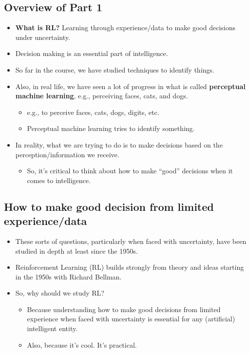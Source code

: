 \subsection{Overview of Part 1}
\begin{summary}
    \begin{itemize}
        \item \textbf{What is RL?} Learning through experience/data to make good decisions under uncertainty.
        \item Decision making is an essential part of intelligence.
        \item So far in the course, we have studied techniques to identify things.
        \item Also, in real life, we have seen a lot of progress in what is called \textbf{perceptual machine learning}, e.g., perceiving faces, cats, and dogs.
        \begin{itemize}
            \item e.g., to perceive faces, cats, dogs, digits, etc.
            \item Perceptual machine learning tries to identify something.
        \end{itemize}
        
        \item In reality, what we are trying to do is to make decisions based on the perception/information we receive.
        \begin{itemize}
            \item So, it's critical to think about how to make ``good'' decisions when it comes to intelligence.
        \end{itemize}
    \end{itemize}
\end{summary}

\subsection{How to make good decision from limited experience/data}
\begin{summary}
    \begin{itemize}
        \item These sorts of questions, particularly when faced with uncertainty, have been studied in depth at least since the 1950s.
        
        \item Reinforcement Learning (RL) builds strongly from theory and ideas starting in the 1950s with Richard Bellman.
        
        \item So, why should we study RL?
        \begin{itemize}
            \item Because understanding how to make good decisions from limited experience when faced with uncertainty is essential for any (artificial) intelligent entity.
            \item Also, because it's cool. It's practical.
        \end{itemize}
    \end{itemize}
\end{summary}

